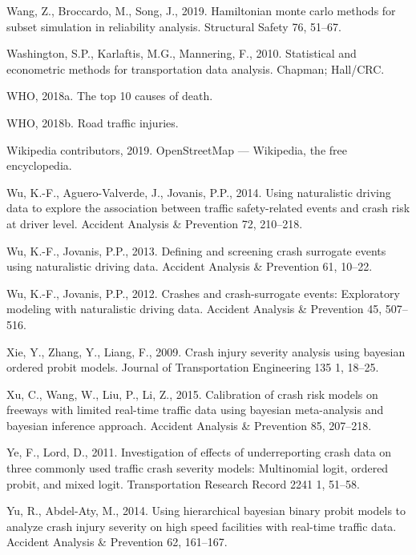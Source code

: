 \documentclass[12pt]{book}
\numberwithin{equation}{chapter}
\begin{document}
\leavevmode\hypertarget{ref-wang2019hamiltonian}{}%
Wang, Z., Broccardo, M., Song, J., 2019. Hamiltonian monte carlo methods for subset simulation in reliability analysis. Structural Safety 76, 51--67.

\leavevmode\hypertarget{ref-washington2010statistical}{}%
Washington, S.P., Karlaftis, M.G., Mannering, F., 2010. Statistical and econometric methods for transportation data analysis. Chapman; Hall/CRC.

\leavevmode\hypertarget{ref-who2018}{}%
WHO, 2018a. The top 10 causes of death.

\leavevmode\hypertarget{ref-who2018b}{}%
WHO, 2018b. Road traffic injuries.

\leavevmode\hypertarget{ref-wikiOSM}{}%
Wikipedia contributors, 2019. OpenStreetMap --- Wikipedia, the free encyclopedia.

\leavevmode\hypertarget{ref-wu2014using}{}%
Wu, K.-F., Aguero-Valverde, J., Jovanis, P.P., 2014. Using naturalistic driving data to explore the association between traffic safety-related events and crash risk at driver level. Accident Analysis \& Prevention 72, 210--218.

\leavevmode\hypertarget{ref-wu2013defining}{}%
Wu, K.-F., Jovanis, P.P., 2013. Defining and screening crash surrogate events using naturalistic driving data. Accident Analysis \& Prevention 61, 10--22.

\leavevmode\hypertarget{ref-wu2012crashes}{}%
Wu, K.-F., Jovanis, P.P., 2012. Crashes and crash-surrogate events: Exploratory modeling with naturalistic driving data. Accident Analysis \& Prevention 45, 507--516.

\leavevmode\hypertarget{ref-xie2009crash}{}%
Xie, Y., Zhang, Y., Liang, F., 2009. Crash injury severity analysis using bayesian ordered probit models. Journal of Transportation Engineering 135 1, 18--25.

\leavevmode\hypertarget{ref-xu2015calibration}{}%
Xu, C., Wang, W., Liu, P., Li, Z., 2015. Calibration of crash risk models on freeways with limited real-time traffic data using bayesian meta-analysis and bayesian inference approach. Accident Analysis \& Prevention 85, 207--218.

\leavevmode\hypertarget{ref-ye2011investigation}{}%
Ye, F., Lord, D., 2011. Investigation of effects of underreporting crash data on three commonly used traffic crash severity models: Multinomial logit, ordered probit, and mixed logit. Transportation Research Record 2241 1, 51--58.

\leavevmode\hypertarget{ref-yu2014using}{}%
Yu, R., Abdel-Aty, M., 2014. Using hierarchical bayesian binary probit models to analyze crash injury severity on high speed facilities with real-time traffic data. Accident Analysis \& Prevention 62, 161--167.
\end{document}
